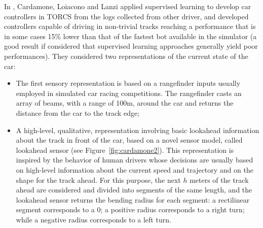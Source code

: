 In  \cite{cardamone}, Cardamone, Loiacono and Lanzi applied supervised learning to develop car controllers in TORCS from the logs collected from other driver, and developed controllers capable of driving in non-trivial tracks reaching a performance that is in some cases 15\% lower than that of the fastest bot available in
the simulator (a good result if considered that supervised learning approaches generally yield poor performances).
They considered two representations of the current state of the car:
\begin{itemize}
\item The first sensory representation is based on a rangefinder inputs usually employed in simulated car racing competitions.
The rangefinder casts an array of beams, with a range of 100m, around the car and returns the distance from the car to the track edge;
\item  A high-level, qualitative, representation involving basic lookahead information about the track in front of the car, based on a  novel sensor model, called lookahead sensor (see Figure~\ref{fig:cardamone2}). This representation is inspired by the behavior of human drivers whose decisions are usually based on high-level information about the current speed and trajectory and on the shape for the track ahead. 
For this purpose, the next $h$ meters of the track ahead are considered and divided into segments of the same length, and the lookahead sensor returns the bending radius for each segment: a rectilinear segment corresponds to a $0$; a positive radius corresponds to a right turn; while a negative radius corresponds to a left turn. 
\end{itemize} 

